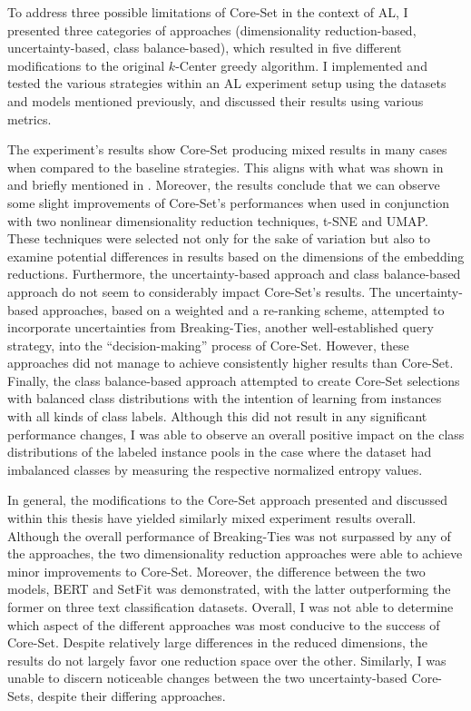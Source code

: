 \documentclass[english,bachelor,ul]{webisthesis} %
\begin{document}
To address three possible limitations of Core-Set in the context of AL, I presented three categories of approaches (dimensionality reduction-based, uncertainty-based, class balance-based), which resulted in five different modifications to the original $k$-Center greedy algorithm. I implemented and tested the various strategies within an AL experiment setup using the datasets and models mentioned previously, and discussed their results using various metrics. 

The experiment's results show Core-Set producing mixed results in many cases when compared to the baseline strategies. This aligns with what was shown in \cite{DBLP:conf/kdd/0002MM21} and briefly mentioned in \cite{DBLP:conf/aaai/ColemanCKCBBNSZ22}. Moreover, the results conclude that we can observe some slight improvements of Core-Set's performances when used in conjunction with two nonlinear dimensionality reduction techniques, t-SNE and UMAP. These techniques were selected not only for the sake of variation but also to examine potential differences in results based on the dimensions of the embedding reductions. Furthermore, the uncertainty-based approach and class balance-based approach do not seem to considerably impact Core-Set's results. The uncertainty-based approaches, based on a weighted and a re-ranking scheme, attempted to incorporate uncertainties from Breaking-Ties, another well-established query strategy, into the ``decision-making'' process of Core-Set. However, these approaches did not manage to achieve consistently higher results than Core-Set. Finally, the class balance-based approach attempted to create Core-Set selections with balanced class distributions with the intention of learning from instances with all kinds of class labels. Although this did not result in any significant performance changes, I was able to observe an overall positive impact on the class distributions of the labeled instance pools in the case where the dataset had imbalanced classes by measuring the respective normalized entropy values.

In general, the modifications to the Core-Set approach presented and discussed within this thesis have yielded similarly mixed experiment results overall. Although the overall performance of Breaking-Ties was not surpassed by any of the approaches, the two dimensionality reduction approaches were able to achieve minor improvements to Core-Set. Moreover, the difference between the two models, BERT and SetFit was demonstrated, with the latter outperforming the former on three text classification datasets. Overall, I was not able to determine which aspect of the different approaches was most conducive to the success of Core-Set. Despite relatively large differences in the reduced dimensions, the results do not largely favor one reduction space over the other. Similarly, I was unable to discern noticeable changes between the two uncertainty-based Core-Sets, despite their differing approaches.
\end{document}
